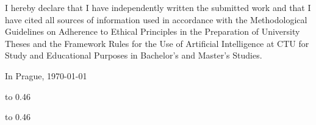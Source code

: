 \openright


\vspace*{\fill}


\noindent




I hereby declare that I have independently written the submitted work and that I have cited all sources of information used in accordance with the Methodological Guidelines on Adherence to Ethical Principles in the Preparation of University Theses and the
Framework Rules for the Use of Artificial Intelligence at CTU for Study and Educational Purposes in Bachelor's and Master's Studies.

\noindent
In Prague, \today


\newpage


\openright

{\InfoPageFont

\vtop to 0.46


\vtop to 0.46
}


\newpage

\openright

